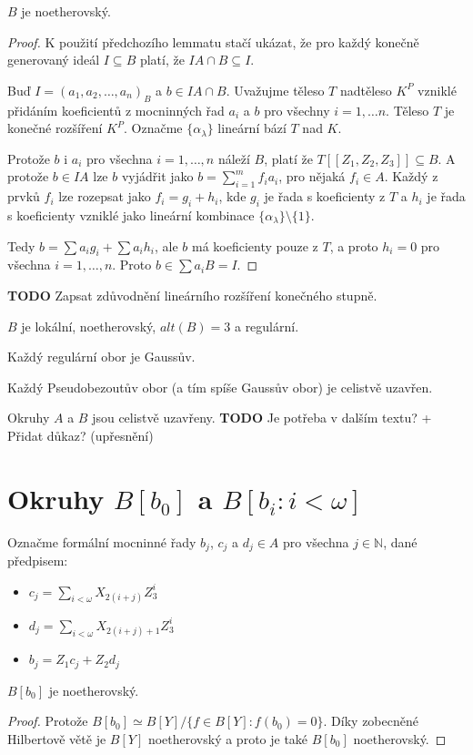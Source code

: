 \documentclass[11pt,a4paper]{article}
\newcommand\m[1]{\mathbb { #1 }} %
\theoremstyle{definition}
\theoremstyle{plain}
\begin{document}
\veta $B$ je noetherovský.
\begin{proof}
	K použití předchozího lemmatu stačí ukázat, že pro každý konečně generovaný
	ideál $I \subseteq B$ platí, že $IA \cap B \subseteq I$.

	Buď $I = (a_1, a_2, \dots, a_n)_B$ a $b \in IA \cap B$. Uvažujme těleso $T$
	nadtěleso $K^P$ vzniklé přidáním koeficientů z mocninných řad $a_i$ a $b$
	pro všechny $i = 1, \dots n$. Těleso $T$ je konečné rozšíření $K^P$.
	Označme $\{\alpha_\lambda\}$ lineární bází $T$ nad $K$.

	Protože $b$ i $a_i$ pro všechna $i=1,\dots,n$ náleží $B$, platí že
	$T[[Z_1,Z_2,Z_3]] \subseteq B$. A protože $b \in IA$ lze $b$ vyjádřit jako
	$b = \sum_{i = 1}^m f_i a_i$, pro nějaká $f_i \in A$. Každý z prvků $f_i$
	lze rozepsat jako $f_i = g_i + h_i$, kde $g_i$ je řada s koeficienty z $T$
	a $h_i$ je řada s koeficienty vzniklé jako lineární kombinace
	$\{\alpha_\lambda\} \setminus \{1\}$.

	Tedy $b = \sum a_ig_i + \sum a_ih_i$, ale $b$ má koeficienty pouze z $T$, a
	proto $h_i = 0$ pro všechna $i = 1,\dots,n$. Proto $b \in \sum a_iB = I$.
\end{proof}
\textbf{TODO} Zapsat zdůvodnění lineárního rozšíření konečného stupně.

\veta $B$ je lokální, noetherovský, $alt(B) = 3$ a regulární.

\tvrzeni[Fakt] Každý regulární obor je Gaussův.

\tvrzeni[Fakt] Každý Pseudobezoutův obor (a tím spíše Gaussův obor) je celistvě uzavřen.

\dusledek Okruhy $A$ a $B$ jsou celistvě uzavřeny.
\textbf{TODO} Je potřeba v dalším textu? + Přidat důkaz? (upřesnění)

\section{Okruhy $B[b_0]$ a $B[b_i : i < \omega]$}
 Označme formální mocninné řady $b_j$, $c_j$ a $d_j \in A$ pro všechna
$j \in \m N$, dané předpisem:
\begin{itemize}
	\item $c_j = \sum_{i < \omega} X_{2(i + j)} Z^i_3$
	\item $d_j = \sum_{i < \omega} X_{2(i + j) + 1} Z^i_3$
	\item $b_j = Z_1c_j + Z_2d_j$
\end{itemize}

\veta $B[b_0]$ je noetherovský.
\begin{proof}
	 Protože $B[b_0] \simeq B[Y] / \{ f \in B[Y] : f(b_0) = 0 \}$. Díky
	 zobecněné Hilbertově větě je $B[Y]$ noetherovský a proto je také $B[b_0]$
	 noetherovský.
\end{proof}
\end{document}
